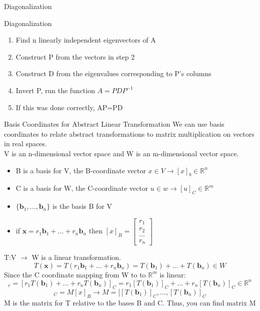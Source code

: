 \documentclass[a4paper, 12pt]{article}
\begin{document}
\begin{section}{Diagonalization}
\begin{subsection}{Diagonalization}
\begin{enumerate}
\item{Find n linearly independent eigenvectors of A}
\item{Construct P from the vectors in step 2}
\item{Construct D from the eigenvalues corresponding to P's columns}
\item{Invert P, run the function $A=PDP^{-1}$}
\item{If this was done correctly, AP=PD}
\end{enumerate}
\end{subsection}
\begin{subsection}{Basis Coordinates for Abstract Linear Transformation}
We can use basis coordinates to relate abstract transformations to matrix 
multiplication on vectors in real spaces.\\
V is an n-dimensional vector space and W is an m-dimensional vector space. 
\begin{itemize}
\item{B is a basis for V, the B-coordinate vector $x\in V \to[x]_{b}\in 
\mathbb{R}^{n}$}
\item{C is a basis for W, the C-coordinate vector $u\in w \to[u]_{C}\in 
\mathbb{R}^{m}$}
\item{$\{\textbf{b}_{1},\dots,\textbf{b}_{n}\}$ is the basis B for V}
\item{if $\textbf{x}=r_1\textbf{b}_{1}+\dots+r_{n}\textbf{b}_{n}$ then 
$[x]_{B}=\begin{bmatrix} r_1\\ r_2\\ \dots \\r_{n} \end{bmatrix} $}
\end{itemize}
T:V $\to$ W is a linear transformation.
\begin{equation}
T(\textbf{x})=T(r_1\textbf{b}_{1}+\dots+r_{n}\textbf{b}_{n})=
T(\textbf{b}_{1})+\dots+T(\textbf{b}_{n}) \in W
\end{equation}
Since the C coordinate mapping from W to to $\mathbb{R}^{m}$ is linear:
\begin{equation}
[T(\textbf{x})]_c=[r_1T(\textbf{b}_{1})+\dots+r_{n}T(\textbf{b}_{n})]_C=
r_1[T(\textbf{b}_{1})]_{C}+\dots+r_{n}[T(\textbf{b}_{n})]_{C} \in \mathbb{R}^{n}
\end{equation}
\begin{equation}
[T(x)]_{C}=M[x]_{B} \to M=[[T(\textbf{b}_1)]_{C},\dots,[T(\textbf{b}_{n})]_{C}
\end{equation}
M is the matrix for T relative to the bases B and C. Thus, you can find matrix M 

\end{subsection}
\end{section}
\end{document}
